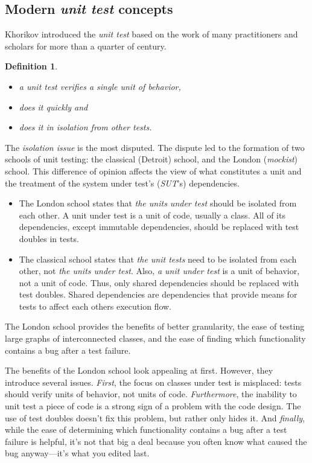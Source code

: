 \documentclass{article}
\newtheorem{definition}{Definition}
\begin{document}
\subsection{Modern \textit{unit test} concepts}

Khorikov \cite{Khoricov2020} introduced the \textit{unit test} based on the work of many practitioners and scholars for more than a quarter of century.

\begin{definition}
\begin{itemize}
Unit tests are automatic tests having the following properties:
	\item a unit test verifies a single unit of behavior,
	\item does it quickly and
	\item does it in isolation from other tests.
\end{itemize}
\end{definition}


The \textit{isolation issue} is the most disputed. The dispute led to the formation of two schools of unit testing: the classical (Detroit) school, and the London (\textit{mockist}) school. This difference of opinion affects the view of what constitutes a unit and the treatment of the system under test’s (\textit{SUT}’s) dependencies.

\begin{itemize}
	\item The London school states that \textit{the units under test} should be isolated from each other. A unit under test is a unit of code, usually a class. All of its dependencies, except immutable dependencies, should be replaced with test doubles in tests.
	\item The classical school states that \textit{the unit tests} need to be isolated from each other, not \textit{the units under test}. Also, \textit{a unit under test} is a unit of behavior, not a unit of code. Thus, only shared dependencies should be replaced with test doubles. Shared dependencies are dependencies that provide means for tests to affect each others execution flow.
\end{itemize}

The London school provides the benefits of better granularity, the ease of testing large graphs of interconnected classes, and the ease of finding which functionality contains a bug after a test failure.

The benefits of the London school look appealing at first. However, they introduce several issues. \textit{First}, the focus on classes under test is misplaced: tests should verify units of behavior, not units of code. \textit{Furthermore}, the inability to unit test a piece of code is a strong sign of a problem with the code design. The use of test doubles doesn’t fix this problem, but rather only hides it. And \textit{finally}, while the ease of determining which functionality contains a bug after a test failure is helpful, it’s not that big a deal because you often know what caused the bug anyway—it’s what you edited last.
\end{document}
